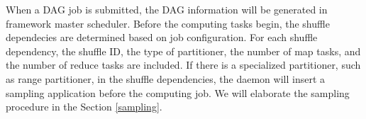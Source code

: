 {\color{blue}
When a DAG job is submitted, the DAG information will be generated in framework master scheduler. 
Before the computing tasks begin, the shuffle dependecies are determined based on job configuration.
}
For each shuffle dependency, the shuffle ID, the type of partitioner, the number of map tasks, and the number of reduce tasks are included.  If there is a specialized partitioner, such as range partitioner, in the shuffle dependencies, the daemon will insert a sampling application before the {\color{blue}computing job}. We will elaborate the sampling procedure in the Section \ref{sampling}.
